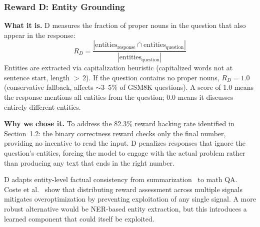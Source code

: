 \subsubsection{Reward D: Entity Grounding}
\nestindent

\textbf{What it is.}
D measures the fraction of proper nouns in the question that also appear in the response:
\[
R_D = \frac{|\text{entities}_\text{response} \cap \text{entities}_\text{question}|}{|\text{entities}_\text{question}|}
\]
Entities are extracted via capitalization heuristic (capitalized words not at sentence start, length ${>}\,2$).
If the question contains no proper nouns, $R_D = 1.0$ (conservative fallback, affects $\sim$3--5\% of GSM8K questions).
A score of 1.0 means the response mentions all entities from the question; 0.0 means it discusses entirely different entities.

\textbf{Why we chose it.}
To address the 82.3\% reward hacking rate identified in Section~1.2: the binary correctness reward checks only the final number, providing no incentive to read the input.
D penalizes responses that ignore the question's entities, forcing the model to engage with the actual problem rather than producing any text that ends in the right number.

D adapts entity-level factual consistency from summarization~\cite{nan2021entity} to math QA.
Coste et al.~\cite{coste2024ensemble} show that distributing reward assessment across multiple signals mitigates overoptimization by preventing exploitation of any single signal.
A more robust alternative would be NER-based entity extraction, but this introduces a learned component that could itself be exploited.
\nestunindent
